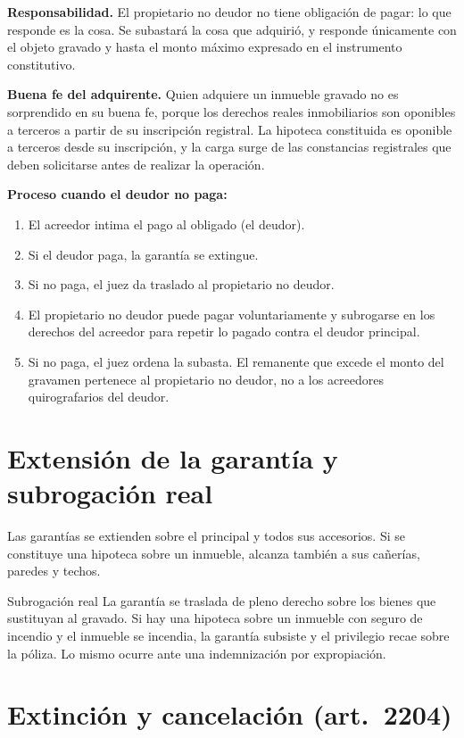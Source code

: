 \documentclass[12pt,oneside]{book}
\begin{document}
\textbf{Responsabilidad.} El propietario no deudor no tiene obligación de pagar: lo que responde es la cosa. Se subastará la cosa que adquirió, y responde únicamente con el objeto gravado y hasta el monto máximo expresado en el instrumento constitutivo.

\textbf{Buena fe del adquirente.} Quien adquiere un inmueble gravado no es sorprendido en su buena fe, porque los derechos reales inmobiliarios son oponibles a terceros a partir de su inscripción registral. La hipoteca constituida es oponible a terceros desde su inscripción, y la carga surge de las constancias registrales que deben solicitarse antes de realizar la operación.

\textbf{Proceso cuando el deudor no paga:}
\begin{enumerate}
    \item El acreedor intima el pago al obligado (el deudor).
    \item Si el deudor paga, la garantía se extingue.
    \item Si no paga, el juez da traslado al propietario no deudor.
    \item El propietario no deudor puede pagar voluntariamente y subrogarse en los derechos del acreedor para repetir lo pagado contra el deudor principal.
    \item Si no paga, el juez ordena la subasta. El remanente que excede el monto del gravamen pertenece al propietario no deudor, no a los acreedores quirografarios del deudor.
\end{enumerate}

\section{Extensión de la garantía y subrogación real}

Las garantías se extienden sobre el principal y todos sus accesorios. Si se constituye una hipoteca sobre un inmueble, alcanza también a sus cañerías, paredes y techos.

\begin{definition}{Subrogación real}
La garantía se traslada de pleno derecho sobre los bienes que sustituyan al gravado. Si hay una hipoteca sobre un inmueble con seguro de incendio y el inmueble se incendia, la garantía subsiste y el privilegio recae sobre la póliza. Lo mismo ocurre ante una indemnización por expropiación.
\end{definition}

\section{Extinción y cancelación (art.~2204)}
\end{document}
